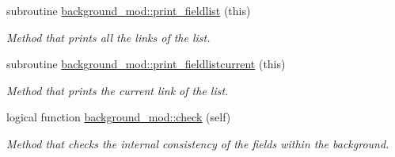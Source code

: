 \begin{DoxyCompactItemize}
subroutine \mbox{\hyperlink{namespacebackground__mod_acdcc52b4fb298bc145a121f9e8a4b929}{background\+\_\+mod\+::print\+\_\+fieldlist}} (this)
\begin{DoxyCompactList}\small\item\em Method that prints all the links of the list. \end{DoxyCompactList}\item 
subroutine \mbox{\hyperlink{namespacebackground__mod_a2bd18f3830c0667741efd086d36753db}{background\+\_\+mod\+::print\+\_\+fieldlistcurrent}} (this)
\begin{DoxyCompactList}\small\item\em Method that prints the current link of the list. \end{DoxyCompactList}\item 
logical function \mbox{\hyperlink{namespacebackground__mod_af2f517e4aa946491744e012153045bd4}{background\+\_\+mod\+::check}} (self)
\begin{DoxyCompactList}\small\item\em Method that checks the internal consistency of the fields within the background. \end{DoxyCompactList}\end{DoxyCompactItemize}
